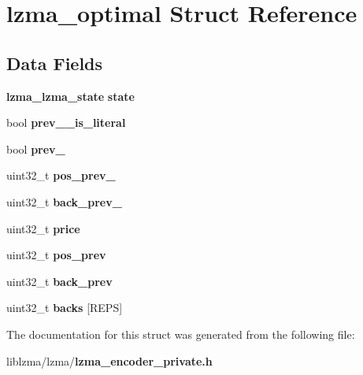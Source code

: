 \section{lzma\-\_\-optimal Struct Reference}
\label{structlzma__optimal}
\subsection*{Data Fields}
\begin{DoxyCompactItemize}
\item 
{\bf lzma\-\_\-lzma\-\_\-state} {\bfseries state}\label{structlzma__optimal_a9baf39597fb1eb57774a6b8251c9aa07}

\item 
bool {\bfseries prev\-\_\-\_\-is\-\_\-literal}\label{structlzma__optimal_ac18b37271462f6071a3ce99602a364a1}

\item 
bool {\bfseries prev\-\_}\label{structlzma__optimal_a040e18f2c85cb496a410a2b59a6f74a3}

\item 
uint32\-\_\-t {\bfseries pos\-\_\-prev\-\_}\label{structlzma__optimal_abbb9657f9d85d6d1b8eaba8d452ea9d8}

\item 
uint32\-\_\-t {\bfseries back\-\_\-prev\-\_}\label{structlzma__optimal_a04430741f7d11430ab1e1fa48f78c3d7}

\item 
uint32\-\_\-t {\bfseries price}\label{structlzma__optimal_ab42b813078a217af0d5a59fb6fb0f49d}

\item 
uint32\-\_\-t {\bfseries pos\-\_\-prev}\label{structlzma__optimal_a007918037a8dabd9b7bdca31f0be7fa2}

\item 
uint32\-\_\-t {\bfseries back\-\_\-prev}\label{structlzma__optimal_a55025d5f894addbfe3c96e0aa05d84bb}

\item 
uint32\-\_\-t {\bfseries backs} [R\-E\-P\-S]\label{structlzma__optimal_a48d0ed5c8c6243fa64aa425c5bc18dac}

\end{DoxyCompactItemize}


The documentation for this struct was generated from the following file\-:\begin{DoxyCompactItemize}
\item 
liblzma/lzma/{\bf lzma\-\_\-encoder\-\_\-private.\-h}\end{DoxyCompactItemize}
